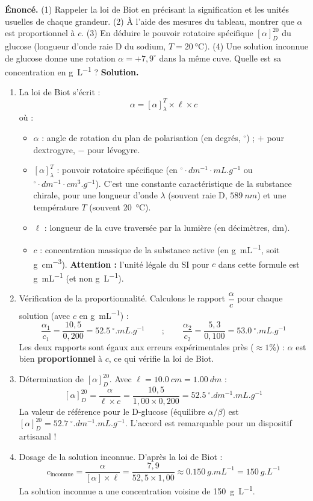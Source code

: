 \documentclass[11pt]{article}
\providecommand{\degree}{^{\circ}}
\newcommand{\cle}[1]{{\popxbold\color{popdark}#1}}
\begin{document}
\begin{exoresolu}
\textbf{Énoncé.} (1) Rappeler la loi de Biot en précisant la signification et les unités usuelles de chaque grandeur. (2) À l'aide des mesures du tableau, montrer que $\alpha$ est proportionnel à $c$. (3) En déduire le pouvoir rotatoire spécifique $[\alpha]_D^{20}$ du glucose (longueur d'onde raie D du sodium, $T = \SI{20}{\celsius}$). (4) Une solution inconnue de glucose donne une rotation $\alpha = +7,9\degree$ dans la même cuve. Quelle est sa concentration en \si{g.L^{-1}} ?
\tcblower
\textbf{Solution.}
\begin{enumerate}
\item La loi de Biot s'écrit :
\[ \alpha = [\alpha]_\lambda^T \times \ell \times c \]
où :
\begin{itemize}
\item $\alpha$ : angle de rotation du plan de polarisation (en degrés, $\degree$) ; $+$ pour dextrogyre, $-$ pour lévogyre.
\item $[\alpha]_\lambda^T$ : \cle{pouvoir rotatoire spécifique} (en $\degree \cdot \si{dm^{-1}} \cdot \si{mL.g^{-1}}$ ou $\degree \cdot \si{dm^{-1}} \cdot \si{cm^3.g^{-1}}$). C'est une constante caractéristique de la substance chirale, pour une longueur d'onde $\lambda$ (souvent raie D, $\SI{589}{nm}$) et une température $T$ (souvent \SI{20}{\celsius}).
\item $\ell$ : longueur de la cuve traversée par la lumière (en décimètres, \si{dm}).
\item $c$ : concentration massique de la substance active (en \si{g.mL^{-1}}, soit \si{g.cm^{-3}}). \textbf{Attention :} l'unité légale du SI pour $c$ dans cette formule est \si{g.mL^{-1}} (et non \si{g.L^{-1}}).
\end{itemize}
\item Vérification de la proportionnalité. Calculons le rapport $\dfrac{\alpha}{c}$ pour chaque solution (avec $c$ en \si{g.mL^{-1}}) :
\[ \frac{\alpha_1}{c_1} = \frac{10,5}{0,200} = \SI{52,5}{\degree.mL.g^{-1}} \qquad ; \qquad \frac{\alpha_2}{c_2} = \frac{5,3}{0,100} = \SI{53,0}{\degree.mL.g^{-1}} \]
Les deux rapports sont égaux aux erreurs expérimentales près ($\approx 1\%$) : $\alpha$ est bien \textbf{proportionnel} à $c$, ce qui vérifie la loi de Biot.
\item Détermination de $[\alpha]_D^{20}$. Avec $\ell = \SI{10,0}{cm} = \SI{1,00}{dm}$ :
\[ [\alpha]_D^{20} = \frac{\alpha}{\ell \times c} = \frac{10,5}{1,00 \times 0,200} = \SI{+52,5}{\degree.dm^{-1}.mL.g^{-1}} \]
La valeur de référence pour le D-glucose (équilibre $\alpha/\beta$) est $[\alpha]_D^{20} = \SI{+52,7}{\degree.dm^{-1}.mL.g^{-1}}$. L'accord est remarquable pour un dispositif artisanal !
\item Dosage de la solution inconnue. D'après la loi de Biot :
\[ c_{\text{inconnue}} = \frac{\alpha}{[\alpha] \times \ell} = \frac{7,9}{52,5 \times 1,00} \approx \SI{0,150}{g.mL^{-1}} = \SI{150}{g.L^{-1}} \]
La solution inconnue a une concentration voisine de \SI{150}{g.L^{-1}}.
\end{enumerate}
\end{exoresolu}
\end{document}
